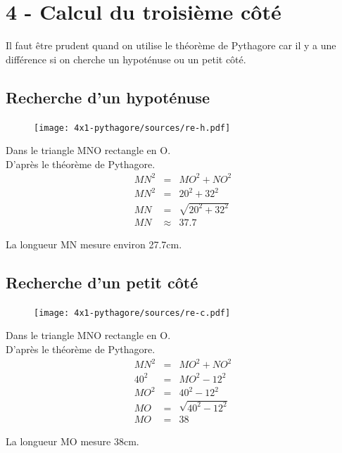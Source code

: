 \documentclass[12pt]{article}
\begin{document}
\newpage
\section*{4 - Calcul du troisième côté}

Il faut être prudent quand on utilise le théorème de Pythagore car il y a une différence si on cherche un hypoténuse ou un petit côté.

\begin{multicols}{2}

	\subsection*{Recherche d'un hypoténuse}

	\begin{figure}[H]
		\centering
		\texttt{[image: 4x1-pythagore/sources/re-h.pdf]}
	\end{figure}

	Dans le triangle MNO rectangle en O.\\
	D'après le théorème de Pythagore.
	\begin{eqnarray*}
		MN^2 &=& MO^2 + NO^2 \\
		MN^2 &=& 20^2 + 32^2 \\
		MN   &=& \sqrt{20^2 + 32^2} \\
		MN   &\approx& 37.7
	\end{eqnarray*}

	La longueur MN mesure environ 27.7cm.


\end{multicols}
\begin{multicols}{2}
	\subsection*{Recherche d'un petit côté}

	\begin{figure}[H]
		\centering
		\texttt{[image: 4x1-pythagore/sources/re-c.pdf]}
	\end{figure}

	Dans le triangle MNO rectangle en O.\\
	D'après le théorème de Pythagore.
	\begin{eqnarray*}
		MN^2 &=& MO^2 + NO^2 \\
		40^2 &=& MO^2 - 12^2 \\
		MO^2 &=& 40^2 - 12^2 \\
		MO   &=& \sqrt{40^2 - 12^2} \\
		MO   &=& 38
	\end{eqnarray*}

	La longueur MO mesure 38cm.

\end{multicols}
\end{document}
